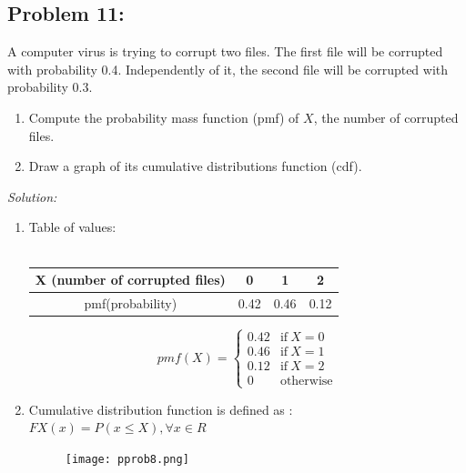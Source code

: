 \documentclass[a4paper]{article}
\begin{document}
	\subsection*{Problem 11:}
	A computer virus is trying to corrupt two files. The first file will be corrupted with probability 0.4. Independently of it, the second file will be corrupted with probability 0.3.
	\begin{enumerate}
		\item Compute the probability mass function (pmf) of $X$, the number of corrupted files.
		\item Draw a graph of its cumulative distributions function (cdf).
	\end{enumerate}
	\textit{Solution:} \\
	\begin{enumerate}
		\item Table of values: \\ \\
		\begin{tabular}{|c|c|c|c|}
			\hline 
			X (number of corrupted files)& 0 & 1 & 2  \\
			\hline
			pmf(probability) & 0.42 & 0.46 & 0.12 \\ 
			\hline
		\end{tabular}
		\begin{equation*}
		pmf(X) = 
		\begin{cases}
		0.42 &\text{if}\ X = 0 \\
		0.46 &\text{if} \ X = 1 \\
		0.12 &\text{if} \ X = 2 \\
		0 &\text{otherwise}
		\end{cases}
		\end{equation*}
		\item Cumulative distribution function is defined as : \\
		$FX(x) = P(x \leq X), \forall x \in R$
		\begin{figure}[H]
		    \centering
		    \texttt{[image: pprob8.png]}
		\end{figure}
	\end{enumerate}
\end{document}
